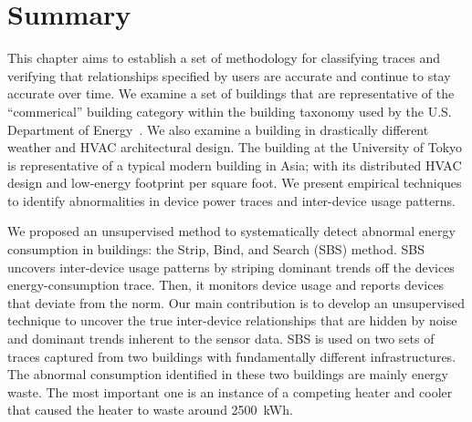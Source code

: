 \section{Summary}



This chapter aims to establish a set of methodology for classifying traces and verifying that relationships specified by
users are accurate and continue to stay accurate over time.  We examine a set of buildings that are representative of the 
``commerical'' building category within the building taxonomy used by the U.S. Department of Energy~\cite{epabuildings}.  We also 
examine a building in drastically different weather and HVAC architectural design.  The building at the University of Tokyo
is representative of a typical modern building in Asia; with its distributed HVAC design and low-energy footprint per square foot.
We present empirical techniques to identify abnormalities in 
device power traces and inter-device usage patterns.

We proposed an unsupervised method to systematically detect abnormal energy consumption in buildings: the Strip, Bind, and Search (SBS) method.
SBS uncovers inter-device usage patterns by striping dominant trends off the devices energy-consumption trace.
Then, it monitors device usage and reports devices that deviate from the norm.  
Our main contribution is to develop an unsupervised technique to uncover the true inter-device relationships that are hidden by noise and 
dominant trends inherent to the sensor data.  
SBS is used on two sets of traces captured from two buildings with fundamentally different infrastructures.
The abnormal consumption identified in these two buildings are mainly energy waste.
The most important one is an instance of a competing heater and cooler that caused the heater to waste around 2500~kWh.




